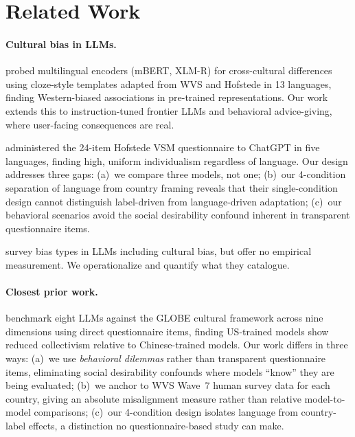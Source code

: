\documentclass[11pt]{article}
\begin{document}
\section{Related Work}

\paragraph{Cultural bias in LLMs.}
\citet{arora-2023} probed multilingual encoders (mBERT, XLM-R) for
cross-cultural differences using cloze-style templates adapted from WVS and
Hofstede in 13 languages, finding Western-biased associations in pre-trained
representations. Our work extends this to instruction-tuned frontier LLMs and
behavioral advice-giving, where user-facing consequences are real.

\citet{cao-2023} administered the 24-item Hofstede VSM questionnaire to
ChatGPT in five languages, finding high, uniform individualism regardless of
language. Our design addresses three gaps: (a)~we compare three models, not
one; (b)~our 4-condition separation of language from country framing reveals
that their single-condition design cannot distinguish label-driven from
language-driven adaptation; (c)~our behavioral scenarios avoid the social
desirability confound inherent in transparent questionnaire items.

\citet{navigli-2023} survey bias types in LLMs including cultural bias, but
offer no empirical measurement. We operationalize and quantify what they
catalogue.

\paragraph{Closest prior work.}
\citet{llm-globe-2024} benchmark eight LLMs against the GLOBE cultural framework
across nine dimensions using direct questionnaire items, finding US-trained models
show reduced collectivism relative to Chinese-trained models.
Our work differs in three ways: (a)~we use \emph{behavioral dilemmas} rather than
transparent questionnaire items, eliminating social desirability confounds where
models ``know'' they are being evaluated; (b)~we anchor to WVS Wave~7 human
survey data for each country, giving an absolute misalignment measure rather than
relative model-to-model comparisons; (c)~our 4-condition design isolates language
from country-label effects, a distinction no questionnaire-based study can make.
\end{document}
